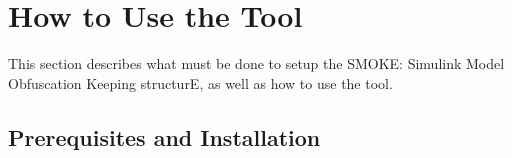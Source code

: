 \documentclass{article}
\makeatletter
\newcommand{\ToolName}{SMOKE: Simulink Model Obfuscation Keeping structurE\@\xspace}
\makeatother
\begin{document}
%
	
\section{How to Use the Tool}
This section describes what must be done to setup the \ToolName, as well as how to use the tool.

\subsection{Prerequisites and Installation}
\end{document}
